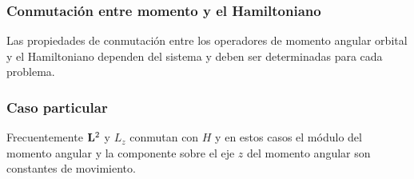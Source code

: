 \documentclass[12pt]{beamer}
\begin{document}
\begin{frame}
\frametitle{Conmutación entre momento y el Hamiltoniano}
Las propiedades de conmutación entre los operadores de momento angular orbital y el Hamiltoniano dependen del sistema y deben ser determinadas para cada problema.
\end{frame}
\begin{frame}
\frametitle{Caso particular}
Frecuentemente $\vb{L}^{2}$ y $L_{z}$ conmutan con $H$ \pause y en estos casos el módulo del momento angular y la componente sobre el eje $z$ del momento angular son constantes de movimiento.
\end{frame}


\end{document}
